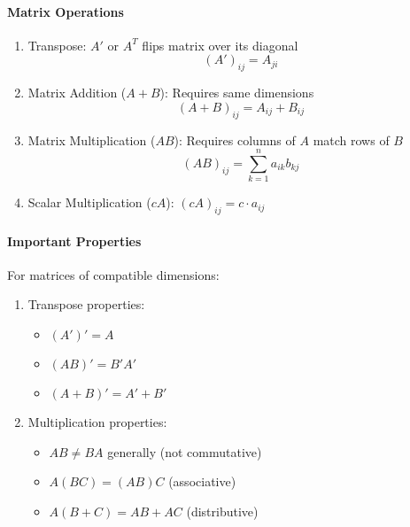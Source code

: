 \paragraph{Matrix Operations}
\begin{enumerate}
    \item Transpose: \(A'\) or \(A^T\) flips matrix over its diagonal
        \[ (A')_{ij} = A_{ji} \]
    
    \item Matrix Addition (\(A + B\)): Requires same dimensions
        \[ (A + B)_{ij} = A_{ij} + B_{ij} \]
    
    \item Matrix Multiplication (\(AB\)): Requires columns of \(A\) match rows of \(B\)
        \[ (AB)_{ij} = \sum_{k=1}^n a_{ik}b_{kj} \]
    
    \item Scalar Multiplication (\(cA\)): \((cA)_{ij} = c \cdot a_{ij}\)
\end{enumerate}

\paragraph{Important Properties}
For matrices of compatible dimensions:
\begin{enumerate}
    \item Transpose properties:
        \begin{itemize}
            \item \((A')' = A\)
            \item \((AB)' = B'A'\)
            \item \((A + B)' = A' + B'\)
        \end{itemize}
    
    \item Multiplication properties:
        \begin{itemize}
            \item \(AB \neq BA\) generally (not commutative)
            \item \(A(BC) = (AB)C\) (associative)
            \item \(A(B + C) = AB + AC\) (distributive)
        \end{itemize}
\end{enumerate}

